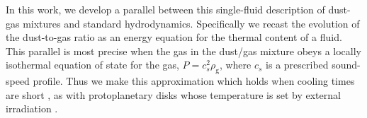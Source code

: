 \documentclass[iop, numberedappendix]{emulateapj}
\newcommand{\rhod}{\rho_\mathrm{d}}
\newcommand{\rhog}{\rho_\mathrm{g}}
\newcommand{\tstop}{t_\mathrm{s}}
\begin{document}
%



In this work, we develop a parallel between this single-fluid description of dust-gas mixtures and standard hydrodynamics.
Specifically we recast the evolution of the dust-to-gas ratio as an energy equation for the thermal content of a fluid.
This parallel is most precise when the gas in the dust/gas mixture obeys a locally isothermal equation of state for the gas, $P = c_s^2\rhog$, where $c_s$ is a prescribed sound-speed profile.  Thus we make this approximation which holds when cooling times are short \citep{lin15}, as with protoplanetary disks 
 whose temperature is set by external irradiation
\citep{chiang97,stam08}. 



 
\end{document}
